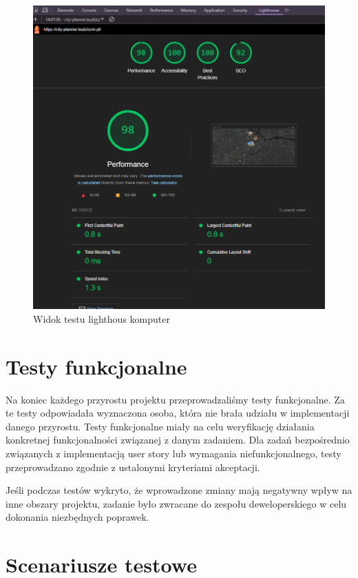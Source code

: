     \begin{figure}[H]
        \centering
        \includegraphics[width=1\textwidth]{attachments/lighthouse}
        \caption{Widok testu lighthous komputer}
        \label{fig:testy-dostepnosci}
        \end{figure}
\section{Testy funkcjonalne}
\label{sec:testy-funkcjonalne}

Na koniec każdego przyrostu projektu przeprowadzaliśmy testy funkcjonalne. Za te testy odpowiadała wyznaczona osoba, która nie brała udziału w implementacji danego przyrostu. 
Testy funkcjonalne miały na celu weryfikację działania konkretnej funkcjonalności związanej z danym zadaniem. \newline
Dla zadań bezpośrednio związanych z implementacją user story lub wymagania niefunkcjonalnego, testy przeprowadzano zgodnie z ustalonymi kryteriami akceptacji. \newline

Jeśli podczas testów wykryto, że wprowadzone zmiany mają negatywny wpływ na inne obszary projektu, zadanie było zwracane do zespołu deweloperskiego w celu dokonania niezbędnych poprawek.
\section{Scenariusze testowe}
\label{sec:scenariusze-testowe}

